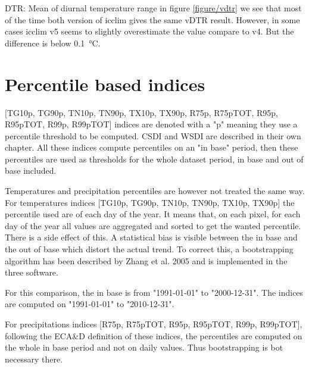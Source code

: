 \documentclass[a4paper,11pt]{article}
\begin{document}
    DTR: Mean of diurnal temperature range
    in figure \ref{figure/vdtr} we see that most of the time both version of icclim gives the same vDTR result.
    However, in some cases icclim v5 seems to slightly overestimate the value compare to v4. But the difference is below 0.1 °C.

\section{Percentile based indices}
    [TG10p, TG90p, TN10p, TN90p, TX10p, TX90p, R75p, R75pTOT, R95p, R95pTOT, R99p, R99pTOT] indices are denoted with a "p" meaning they use a percentile threshold to be computed. CSDI and WSDI are described in their own chapter.
    All these indices compute percentiles on an "in base" period, then these percentiles are used as thresholds for the whole dataset period, in base and out of base included.

    Temperatures and precipitation percentiles are however not treated the same way. 
    For temperatures indices [TG10p, TG90p, TN10p, TN90p, TX10p, TX90p] the percentile used are of each day of the year. It means that, on each pixel, for each day of the year all values are aggregated and sorted to get the wanted percentile. 
    There is a side effect of this. A statistical bias is visible between the in base and the out of base which distort the actual trend.
    To correct this, a bootstrapping algorithm has been described by Zhang et al. 2005 \cite{quote/zhang_et_al} and is implemented in the three software.

    For this comparison, the in base is from "1991-01-01" to "2000-12-31".
    The indices are computed on "1991-01-01" to "2010-12-31".

    For precipitations indices [R75p, R75pTOT, R95p, R95pTOT, R99p, R99pTOT], following the ECA\&D definition of these indices, the percentiles are computed on the whole in base period and not on daily values. Thus bootstrapping is bot necessary there.
\end{document}
